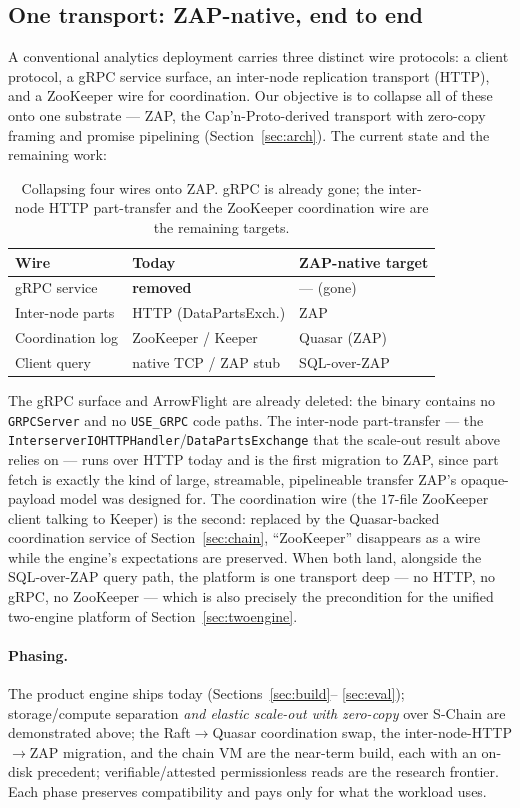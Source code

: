 \subsection{One transport: ZAP-native, end to end}
\label{sec:zapnative}

A conventional analytics deployment carries three distinct wire protocols: a
client protocol, a gRPC service surface, an inter-node replication transport
(HTTP), and a ZooKeeper wire for coordination. Our objective is to collapse all
of these onto one substrate --- ZAP, the Cap'n-Proto-derived transport with
zero-copy framing and promise pipelining (Section~\ref{sec:arch}). The current
state and the remaining work:

\begin{table}[H]
\centering
\small
\begin{tabular}{@{}lll@{}}
\toprule
Wire & Today & ZAP-native target \\
\midrule
gRPC service     & \textbf{removed}      & --- (gone) \\
Inter-node parts & HTTP (DataPartsExch.) & ZAP \\
Coordination log & ZooKeeper / Keeper    & Quasar (ZAP) \\
Client query     & native TCP / ZAP stub & SQL-over-ZAP \\
\bottomrule
\end{tabular}
\caption{Collapsing four wires onto ZAP. gRPC is already gone; the inter-node
HTTP part-transfer and the ZooKeeper coordination wire are the remaining
targets.}
\label{tab:zapnative}
\end{table}

The gRPC surface and ArrowFlight are already deleted: the binary contains no
\texttt{GRPCServer} and no \texttt{USE\_GRPC} code paths. The inter-node
part-transfer --- the \texttt{InterserverIOHTTPHandler}/\texttt{DataPartsExchange}
that the scale-out result above relies on --- runs over HTTP today and is the
first migration to ZAP, since part fetch is exactly the kind of large,
streamable, pipelineable transfer ZAP's opaque-payload model was designed for.
The coordination wire (the $17$-file ZooKeeper client talking to Keeper) is the
second: replaced by the Quasar-backed coordination service of
Section~\ref{sec:chain}, ``ZooKeeper'' disappears as a wire while the engine's
expectations are preserved. When both land, alongside the SQL-over-ZAP query
path, the platform is one transport deep --- no HTTP, no gRPC, no ZooKeeper ---
which is also precisely the precondition for the unified two-engine platform of
Section~\ref{sec:twoengine}.

\paragraph{Phasing.} The product engine ships today (Sections~\ref{sec:build}--%
\ref{sec:eval}); storage/compute separation \emph{and elastic scale-out with
zero-copy} over S-Chain are demonstrated above; the Raft$\rightarrow$Quasar
coordination swap, the inter-node-HTTP$\rightarrow$ZAP migration, and the chain
VM are the near-term build, each with an on-disk precedent; verifiable/attested
permissionless reads are the research frontier. Each phase preserves
compatibility and pays only for what the workload uses.
